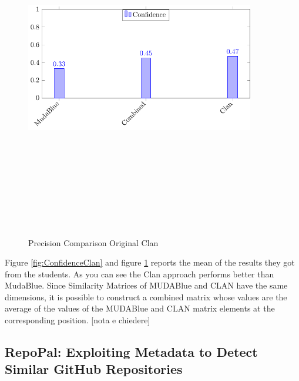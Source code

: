 \begin{figure}[H]
\includegraphics[width=10cm,height=15cm,keepaspectratio]{images/PrecisionClan.pdf}
\centering
\caption{Precision Comparison Original Clan}
\label{fig:PrecisionClan}
\end{figure}

Figure \ref{fig:ConfidenceClan} and figure \ref{fig:PrecisionClan} reports the mean of the results they got from the students. As you can see the Clan approach performs better than MudaBlue. Since Similarity Matrices of MUDABlue and CLAN have the same dimensions, it is possible to construct a combined matrix whose values are the average of the values of the MUDABlue and CLAN matrix elements at the
corresponding position. [nota e chiedere]
\clearpage



\subsection{RepoPal: Exploiting Metadata to Detect Similar GitHub Repositories}\label{sec:repopal}


